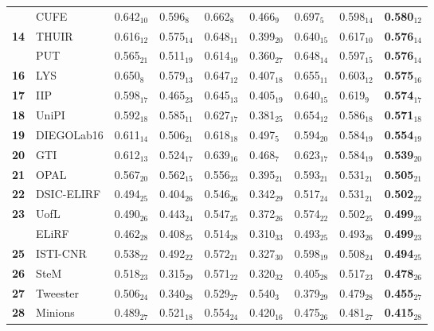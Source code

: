\begin{table*}[tbh]
\begin{small}
\begin{tabular}{|c|l|ll|lll|l|l|}
& CUFE & 0.642$_{10}$ & 0.596$_{8}$ & 0.662$_{8}$ & 0.466$_{9}$ & 0.697$_{5}$ & 0.598$_{14}$ & \bf 0.580$_{12}$ \\
\bf 14 & THUIR & 0.616$_{12}$ & 0.575$_{14}$ & 0.648$_{11}$ & 0.399$_{20}$ & 0.640$_{15}$ & 0.617$_{10}$ & \bf 0.576$_{14}$ \\
& PUT & 0.565$_{21}$ & 0.511$_{19}$ & 0.614$_{19}$ & 0.360$_{27}$ & 0.648$_{14}$ & 0.597$_{15}$ & \bf 0.576$_{14}$ \\
\bf 16 & LYS & 0.650$_{8}$ & 0.579$_{13}$ & 0.647$_{12}$ & 0.407$_{18}$ & 0.655$_{11}$ & 0.603$_{12}$ & \bf 0.575$_{16}$ \\
\bf 17 & IIP & 0.598$_{17}$ & 0.465$_{23}$ & 0.645$_{13}$ & 0.405$_{19}$ & 0.640$_{15}$ & 0.619$_{9}$ & \bf 0.574$_{17}$ \\
\bf 18 & UniPI & 0.592$_{18}$ & 0.585$_{11}$ & 0.627$_{17}$ & 0.381$_{25}$ & 0.654$_{12}$ & 0.586$_{18}$ & \bf 0.571$_{18}$ \\
\bf 19 & DIEGOLab16 & 0.611$_{14}$ & 0.506$_{21}$ & 0.618$_{18}$ & 0.497$_{5}$ & 0.594$_{20}$ & 0.584$_{19}$ & \bf 0.554$_{19}$ \\
\bf 20 & GTI & 0.612$_{13}$ & 0.524$_{17}$ & 0.639$_{16}$ & 0.468$_{7}$ & 0.623$_{17}$ & 0.584$_{19}$ & \bf 0.539$_{20}$ \\
\bf 21 & OPAL & 0.567$_{20}$ & 0.562$_{15}$ & 0.556$_{23}$ & 0.395$_{21}$ & 0.593$_{21}$ & 0.531$_{21}$ & \bf 0.505$_{21}$ \\
\bf 22 & DSIC-ELIRF & 0.494$_{25}$ & 0.404$_{26}$ & 0.546$_{26}$ & 0.342$_{29}$ & 0.517$_{24}$ & 0.531$_{21}$ & \bf 0.502$_{22}$ \\
\bf 23 & UofL & 0.490$_{26}$ & 0.443$_{24}$ & 0.547$_{25}$ & 0.372$_{26}$ & 0.574$_{22}$ & 0.502$_{25}$ & \bf 0.499$_{23}$ \\
& ELiRF & 0.462$_{28}$ & 0.408$_{25}$ & 0.514$_{28}$ & 0.310$_{33}$ & 0.493$_{25}$ & 0.493$_{26}$ & \bf 0.499$_{23}$ \\
\bf 25 & ISTI-CNR & 0.538$_{22}$ & 0.492$_{22}$ & 0.572$_{21}$ & 0.327$_{30}$ & 0.598$_{19}$ & 0.508$_{24}$ & \bf 0.494$_{25}$ \\
\bf 26 & SteM & 0.518$_{23}$ & 0.315$_{29}$ & 0.571$_{22}$ & 0.320$_{32}$ & 0.405$_{28}$ & 0.517$_{23}$ & \bf 0.478$_{26}$ \\
\bf 27 & Tweester & 0.506$_{24}$ & 0.340$_{28}$ & 0.529$_{27}$ & 0.540$_{3}$ & 0.379$_{29}$ & 0.479$_{28}$ & \bf 0.455$_{27}$ \\
\bf 28 & Minions & 0.489$_{27}$ & 0.521$_{18}$ & 0.554$_{24}$ & 0.420$_{16}$ & 0.475$_{26}$ & 0.481$_{27}$ & \bf 0.415$_{28}$ \\

\end{tabular}
\end{small}
\end{table*}
